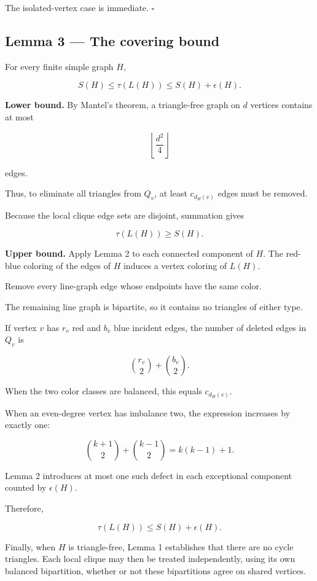 \documentclass[11pt]{article}
\begin{document}
The isolated-vertex case is immediate. \(\square\)

\subsection{Lemma 3 --- The covering bound}

For every finite simple graph \(H\),

\[
S(H)\leq\tau(L(H))\leq S(H)+\epsilon(H).
\]

\textbf{Lower bound.} By Mantel's theorem, a triangle-free graph on \(d\) vertices contains at most

\[
\left\lfloor\frac{d^2}{4}\right\rfloor
\]

edges.

Thus, to eliminate all triangles from \(Q_v\), at least \(c_{d_H(v)}\) edges must be removed.

Because the local clique edge sets are disjoint, summation gives

\[
\tau(L(H))\geq S(H).
\]

\textbf{Upper bound.} Apply Lemma 2 to each connected component of \(H\). The red-blue coloring of the edges of \(H\) induces a vertex coloring of \(L(H)\).

Remove every line-graph edge whose endpoints have the same color.

The remaining line graph is bipartite, so it contains no triangles of either type.

If vertex \(v\) has \(r_v\) red and \(b_v\) blue incident edges, the number of deleted edges in \(Q_v\) is

\[
\binom{r_v}{2}+\binom{b_v}{2}.
\]

When the two color classes are balanced, this equals \(c_{d_H(v)}\).

When an even-degree vertex has imbalance two, the expression increases by exactly one:

\[
\binom{k+1}{2}+\binom{k-1}{2}
=k(k-1)+1.
\]

Lemma 2 introduces at most one such defect in each exceptional component counted by \(\epsilon(H)\).

Therefore,

\[
\tau(L(H))\leq S(H)+\epsilon(H).
\]

Finally, when \(H\) is triangle-free, Lemma 1 establishes that there are no cycle triangles. Each local clique may then be treated independently, using its own balanced bipartition, whether or not these bipartitions agree on shared vertices.
\end{document}
